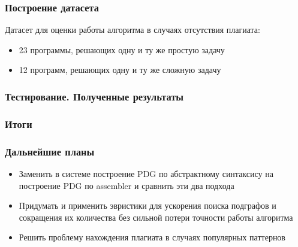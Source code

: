 \documentclass[10pt]{beamer}
\begin{document}
\begin{frame}\frametitle{Построение датасета}
	Датасет для оценки работы алгоритма в случаях отсутствия плагиата:
	\begin{itemize}
		\item 23 программы, решающих одну и ту же простую задачу
		\item 12 программ, решающих одну и ту же сложную задачу
	\end{itemize}
	
\end{frame}

\begin{frame}\frametitle{Тестирование. Полученные результаты}
    
\end{frame}

\begin{frame}\frametitle{Итоги}
\end{frame}

\begin{frame}\frametitle{Дальнейшие планы}
    \begin{itemize}
        \item Заменить в системе построение PDG по абстрактному синтаксису на построение PDG по assembler и сравнить эти два подхода
        \item Придумать и применить эвристики для ускорения поиска подграфов и сокращения их количества без сильной потери точности работы алгоритма
        \item Решить проблему нахождения плагиата в случаях популярных паттернов
        
    \end{itemize}
\end{frame}
\end{document}
